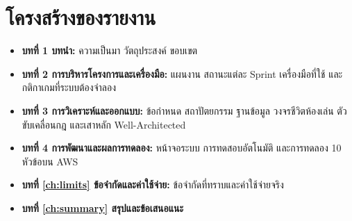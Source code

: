 \section{โครงสร้างของรายงาน}

\begin{itemize}
    \item \textbf{บทที่ 1 บทนำ:} ความเป็นมา วัตถุประสงค์ ขอบเขต
    \item \textbf{บทที่ 2 การบริหารโครงการและเครื่องมือ:} แผนงาน สถานะแต่ละ Sprint เครื่องมือที่ใช้ และกติกาเกมที่ระบบต้องจำลอง
    \item \textbf{บทที่ 3 การวิเคราะห์และออกแบบ:} ข้อกำหนด สถาปัตยกรรม ฐานข้อมูล วงจรชีวิตห้องเล่น ตัวขับเคลื่อนกฎ และเสาหลัก Well-Architected
    \item \textbf{บทที่ 4 การพัฒนาและผลการทดลอง:} หน้าจอระบบ การทดสอบอัตโนมัติ และการทดลอง 10 หัวข้อบน AWS
    \item \textbf{บทที่ \ref{ch:limits} ข้อจำกัดและค่าใช้จ่าย:} ข้อจำกัดที่ทราบและค่าใช้จ่ายจริง
    \item \textbf{บทที่ \ref{ch:summary} สรุปและข้อเสนอแนะ}
\end{itemize}

